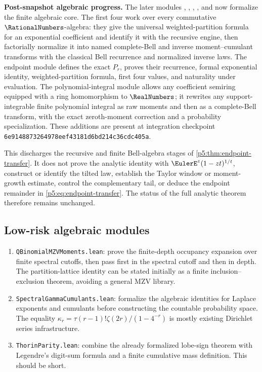\documentclass[11pt]{article}
\numberwithin{equation}{section}
\theoremstyle{definition}
\theoremstyle{remark}
\begin{document}
\begin{boxedremark}
\textbf{Post-snapshot algebraic progress.}
The later modules ,
, ,
, and
 now formalize the finite algebraic
core.  The first four work over every commutative \(\RationalNumbers\)-algebra: they
give the universal weighted-partition formula for an exponential coefficient
and identify it with the recursive
 engine, then factorially normalize it
into named complete-Bell and inverse moment--cumulant transforms with the
classical Bell recurrence and normalized inverse laws.  The endpoint module
defines the exact \(P_r\), proves their recurrence, formal exponential identity,
weighted-partition formula, first four values, and naturality under evaluation.
The polynomial-integral module allows any coefficient semiring equipped with
a ring homomorphism to \(\RealNumbers\); it rewrites any support-integrable finite
polynomial integral as raw moments and then as a complete-Bell transform, with
the exact zeroth-moment correction and a probability specialization.  These additions are
present at integration checkpoint
\texttt{6e9148873264978eef43181d6bd214c36cdc405a}.

This discharges the recursive and finite Bell-algebra stages of
\cref{p5:thm:endpoint-transfer}.  It does not prove the analytic identity with
\(\EulerE^z(1-zt)^{1/t}\), construct or identify the tilted law, establish the
Taylor window or moment-growth estimate, control the complementary tail, or
deduce the endpoint remainder in \eqref{p5:eq:endpoint-transfer}.  The status of
the full analytic theorem therefore remains unchanged.
\end{boxedremark}

\subsection{Low-risk algebraic modules}

\begin{enumerate}
\item \texttt{QBinomialMZVMoments.lean}: prove the finite-depth occupancy
      expansion over finite spectral cutoffs, then pass first in the spectral
      cutoff and then in depth.  The partition-lattice identity can be stated
      initially as a finite inclusion--exclusion theorem, avoiding a general
      MZV library.
\item \texttt{SpectralGammaCumulants.lean}: formalize the algebraic identities
      for Laplace exponents and cumulants before constructing the countable
      probability space.  The equality
      $\kappa_r=\tau(r-1)!\zeta(2r)/(1-4^{-r})$ is mostly existing Dirichlet
      series infrastructure.
\item \texttt{ThorinParity.lean}: combine the already formalized lobe-sign
      theorem with Legendre's digit-sum formula and a finite cumulative mass
      definition.  This should be short.
\end{enumerate}
\end{document}
